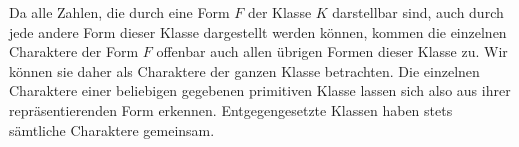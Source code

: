Da alle Zahlen, die durch eine Form $F$ der Klasse $K$ darstellbar sind, auch durch jede andere Form dieser Klasse dargestellt werden können, kommen die einzelnen Charaktere der Form $F$ offenbar auch allen übrigen Formen dieser Klasse zu. Wir können sie daher als Charaktere der ganzen Klasse betrachten. Die einzelnen Charaktere einer beliebigen gegebenen primitiven Klasse lassen sich also aus ihrer repräsentierenden Form erkennen. Entgegengesetzte Klassen haben stets sämtliche Charaktere gemeinsam.
